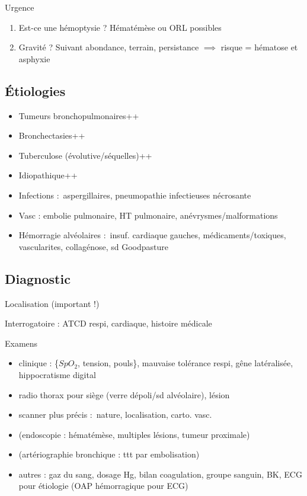 Urgence \skull

\begin{enumerate}
  \item Est-ce une hémoptysie ? Hématémèse ou ORL possibles
  \item Gravité ? Suivant abondance, terrain, persistance $\implies$ risque = hématose et asphyxie
\end{enumerate}

\subsection{Étiologies}
\begin{itemize}
  \item Tumeurs bronchopulmonaires++
  \item Bronchectasies++
  \item Tuberculose (évolutive/séquelles)++
  \item Idiopathique++
  \item Infections : aspergillaires, pneumopathie infectieuses nécrosante
  \item Vasc : embolie pulmonaire, HT pulmonaire, anévrysmes/malformations
  \item Hémorragie alvéolaires : insuf. cardiaque gauches, médicaments/toxiques,
    vascularites, collagénose, sd Goodpasture
\end{itemize}

\subsection{Diagnostic}
Localisation (important !)

Interrogatoire : ATCD respi, cardiaque, histoire médicale

Examens 
\begin{itemize}
  \item clinique : \{$SpO_2$, tension, pouls\}, mauvaise tolérance respi, gêne
    latéralisée, hippocratisme digital
  \item radio thorax pour siège (verre dépoli/sd alvéolaire), lésion
  \item scanner plus précis : nature, localisation, carto. vasc.
  \item (endoscopie : hématémèse, multiples lésions, tumeur proximale)
  \item (artériographie bronchique : ttt par embolisation)
  \item autres : gaz du sang, dosage Hg, bilan coagulation, groupe sanguin, {BK,
    ECG} pour étiologie (OAP hémorragique pour ECG)
\end{itemize}

